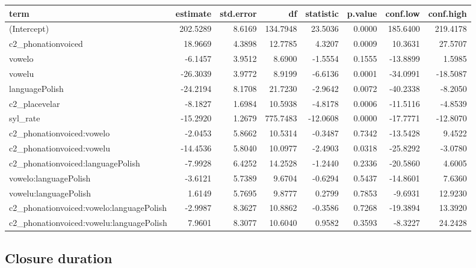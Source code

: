 \documentclass[preprint]{JASAnew}
\begin{document}
\begin{tabular}{lrrrrrrr}
\toprule
term & estimate & std.error & df & statistic & p.value & conf.low & conf.high\\
\midrule
(Intercept) & 202.5289 & 8.6169 & 134.7948 & 23.5036 & 0.0000 & 185.6400 & 219.4178\\
c2\_phonationvoiced & 18.9669 & 4.3898 & 12.7785 & 4.3207 & 0.0009 & 10.3631 & 27.5707\\
vowelo & -6.1457 & 3.9512 & 8.6900 & -1.5554 & 0.1555 & -13.8899 & 1.5985\\
vowelu & -26.3039 & 3.9772 & 8.9199 & -6.6136 & 0.0001 & -34.0991 & -18.5087\\
languagePolish & -24.2194 & 8.1708 & 21.7230 & -2.9642 & 0.0072 & -40.2338 & -8.2050\\
\addlinespace
c2\_placevelar & -8.1827 & 1.6984 & 10.5938 & -4.8178 & 0.0006 & -11.5116 & -4.8539\\
syl\_rate & -15.2920 & 1.2679 & 775.7483 & -12.0608 & 0.0000 & -17.7771 & -12.8070\\
c2\_phonationvoiced:vowelo & -2.0453 & 5.8662 & 10.5314 & -0.3487 & 0.7342 & -13.5428 & 9.4522\\
c2\_phonationvoiced:vowelu & -14.4536 & 5.8040 & 10.0977 & -2.4903 & 0.0318 & -25.8292 & -3.0780\\
c2\_phonationvoiced:languagePolish & -7.9928 & 6.4252 & 14.2528 & -1.2440 & 0.2336 & -20.5860 & 4.6005\\
\addlinespace
vowelo:languagePolish & -3.6121 & 5.7389 & 9.6704 & -0.6294 & 0.5437 & -14.8601 & 7.6360\\
vowelu:languagePolish & 1.6149 & 5.7695 & 9.8777 & 0.2799 & 0.7853 & -9.6931 & 12.9230\\
c2\_phonationvoiced:vowelo:languagePolish & -2.9987 & 8.3627 & 10.8862 & -0.3586 & 0.7268 & -19.3894 & 13.3920\\
c2\_phonationvoiced:vowelu:languagePolish & 7.9601 & 8.3077 & 10.6040 & 0.9582 & 0.3593 & -8.3227 & 24.2428\\
\bottomrule
\end{tabular}
\normalsize

\hypertarget{closure-duration}{%
\subsection{Closure duration}\label{closure-duration}}

\scriptsize
\end{document}
